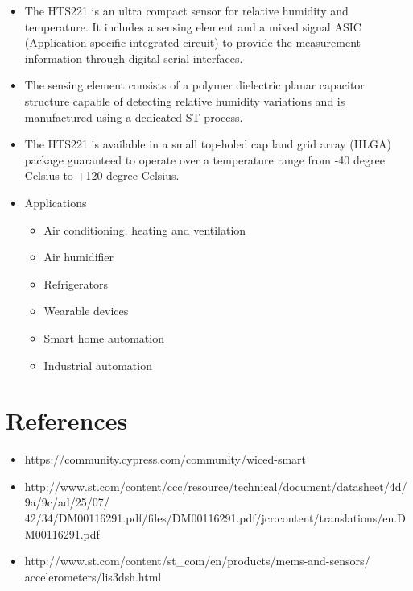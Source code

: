 \documentclass[11pt,a4paper]{article}
\begin{document}
\begin{itemize}
\item The HTS221 is an ultra compact sensor for
relative humidity and temperature. It includes a
sensing element and a mixed signal ASIC (Application-specific integrated circuit) to
provide the measurement information through
digital serial interfaces.
\item
The sensing element consists of a polymer
dielectric planar capacitor structure capable of
detecting relative humidity variations and is
manufactured using a dedicated ST process.
\item The HTS221 is available in a small top-holed cap
land grid array (HLGA) package guaranteed to
operate over a temperature range from -40 degree Celsius to
+120 degree Celsius.

\item Applications
\begin{itemize}
\item Air conditioning, heating and ventilation
\item Air humidifier
\item Refrigerators
\item Wearable devices 
\item Smart home automation
\item Industrial automation
\end{itemize}
 \end{itemize}





\newpage
	\section{References}
	 \begin{itemize}
	 \item https://community.cypress.com/community/wiced-smart
	 \item http://www.st.com/content/ccc/resource/technical/document/datasheet/4d/9a/9c/ad/25/07/\\42/34/DM00116291.pdf/files/DM00116291.pdf/jcr:content/translations/en.DM00116291.pdf
	 
	 \item http://www.st.com/content/st_com/en/products/mems-and-sensors/\\accelerometers/lis3dsh.html
	 
	
	     \end{itemize}
	    
\end{document}
